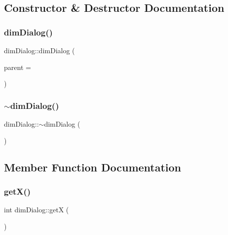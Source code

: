 \subsection{Constructor \& Destructor Documentation}
\mbox{\label{classdim_dialog_abda7437ba444409c789daae87b76202e}} 
\subsubsection{\texorpdfstring{dim\+Dialog()}{dimDialog()}}
{\footnotesize\ttfamily dim\+Dialog\+::dim\+Dialog (\begin{DoxyParamCaption}\item[{Q\+Widget $\ast$}]{parent = {} }\end{DoxyParamCaption})\hspace{0.3cm}{\ttfamily [explicit]}}

\mbox{\label{classdim_dialog_a176042f4a3ee628112b5fa1a1737e297}} 
\subsubsection{\texorpdfstring{$\sim$dim\+Dialog()}{~dimDialog()}}
{\footnotesize\ttfamily dim\+Dialog\+::$\sim$dim\+Dialog (\begin{DoxyParamCaption}{ }\end{DoxyParamCaption})}



\subsection{Member Function Documentation}
\mbox{\label{classdim_dialog_a6ad381992f86793368f0b6f2a5c3c32e}} 
\subsubsection{\texorpdfstring{get\+X()}{getX()}}
{\footnotesize\ttfamily int dim\+Dialog\+::getX (\begin{DoxyParamCaption}{ }\end{DoxyParamCaption})}


